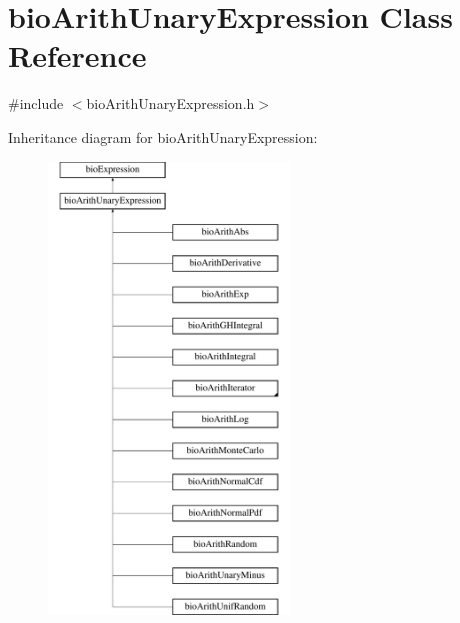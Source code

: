 \hypertarget{classbio_arith_unary_expression}{}\section{bio\+Arith\+Unary\+Expression Class Reference}
\label{classbio_arith_unary_expression}


{\ttfamily \#include $<$bio\+Arith\+Unary\+Expression.\+h$>$}

Inheritance diagram for bio\+Arith\+Unary\+Expression\+:\begin{figure}[H]
\begin{center}
\leavevmode
\includegraphics[height=12.000000cm]{classbio_arith_unary_expression}
\end{center}
\end{figure}
